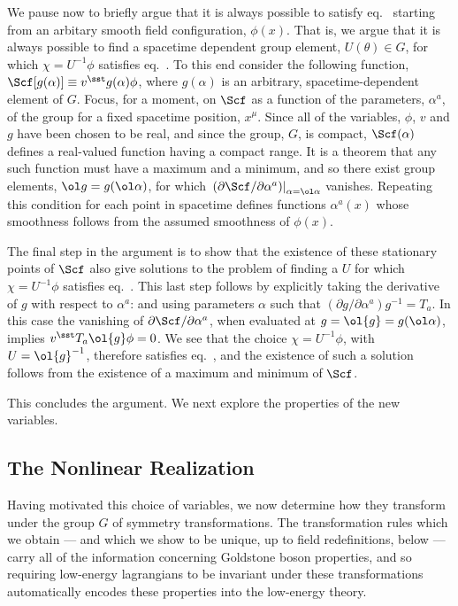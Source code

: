 \documentclass[12pt,epsf]{report}
\begin{document}
We pause now to briefly argue that it is always possible to
satisfy eq.~ starting from an arbitary smooth
field configuration, $\phi(x)$. That is, we argue that it
is always possible to find a spacetime dependent group
element, $U(\theta) \in G$, for which 
$\chi = U^{-1} \phi$ satisfies eq.~. 
To this end consider the following
function, $\Scf[g(\alpha)] \equiv v^\sst g(\alpha) \phi$,
where $g(\alpha)$ is an arbitrary, spacetime-dependent
element of $G$. Focus, for a moment, on $\Scf$ as a function
of the parameters, $\alpha^a$, of the group for a fixed
spacetime position, $x^\mu$. Since all of the variables,
$\phi$, $v$ and $g$ have been chosen to be real, and since
the group, $G$, is compact, $\Scf(\alpha)$ defines a
real-valued function having a compact range. It is a
theorem that any such function must have a maximum and a
minimum, and so there exist group elements, $\ol g =
g(\ol\alpha)$, for which $\left. 
(\partial \Scf / \partial\alpha^a) \right|_{\alpha =
\ol\alpha}$ vanishes. Repeating this condition for each
point in spacetime defines functions $\alpha^a(x)$ whose
smoothness follows from the assumed smoothness of $\phi(x)$.

The final step in the argument is to show that the
existence of these stationary points of $\Scf$ also give
solutions to the problem of finding a $U$ for which $\chi =
U^{-1} \phi$ satisfies 
eq.~. This last step follows by explicitly
taking the derivative of $g$ with respect to $\alpha^a$:
and using parameters $\alpha$ such that $(\partial g/
\partial \alpha^a) g^{-1} = T_a$. In this case the
vanishing of $\partial \Scf/ \partial\alpha^a$, when
evaluated at $g = \ol{g} = g(\ol\alpha)$, implies $v^\sst
T_a \ol{g} \phi = 0$. We see that the choice $\chi = U^{-1}
\phi$, with $U = \ol{g}^{-1}$, therefore satisfies
eq.~, and the existence of such a solution
follows from the existence of a maximum and minimum of
$\Scf$.

This concludes the argument. We next explore the properties
of the new variables.

\subsection{The Nonlinear Realization}

Having motivated this choice of variables, we now determine
how they transform under the group $G$ of symmetry
transformations. The transformation rules which we obtain
--- and which we show to be unique, up to field
redefinitions, below --- carry all of the information
concerning Goldstone boson properties, and so requiring
low-energy lagrangians to be invariant under these
transformations automatically encodes these properties into
the low-energy theory.
\end{document}
